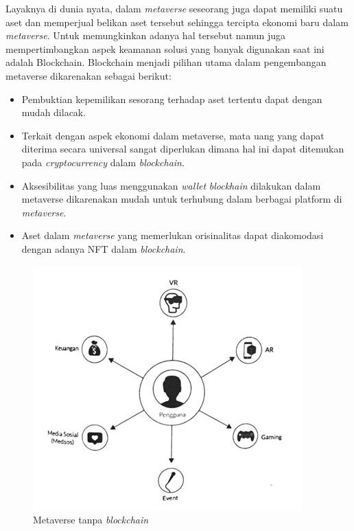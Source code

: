 Layaknya di dunia nyata, dalam \emph{metaverse} seseorang juga dapat memiliki suatu aset dan memperjual belikan aset tersebut sehingga tercipta ekonomi baru dalam \emph{metaverse}. Untuk memungkinkan adanya hal tersebut namun juga mempertimbangkan aspek keamanan solusi yang banyak digunakan saat ini adalah Blockchain. Blockchain menjadi pilihan utama dalam pengembangan metaverse dikarenakan sebagai berikut:
\begin{itemize}
    \item Pembuktian kepemilikan sesorang terhadap aset tertentu dapat dengan mudah dilacak.
    \item Terkait dengan aspek ekonomi dalam metaverse, mata uang yang dapat diterima secara universal sangat diperlukan dimana hal ini dapat ditemukan pada \emph{cryptocurrency} dalam \emph{blockchain}.
    \item Aksesibilitas yang luas menggunakan \emph{wallet} \emph{blockhain} dilakukan dalam metaverse dikarenakan mudah untuk terhubung dalam berbagai platform di \emph{metaverse}.
    \item Aset dalam \emph{metaverse} yang memerlukan orisinalitas dapat diakomodasi dengan adanya NFT dalam \emph{blockchain}.
\end{itemize}\parencite{DouglasTjokrostetio}

\begin{figure} [ht] \centering
  \includegraphics[scale=0.6]{gambar/img-metaverse-3.jpg}
  \caption{Metaverse tanpa \emph{blockchain}}
  \label{fig:Metaverse}
\end{figure}

